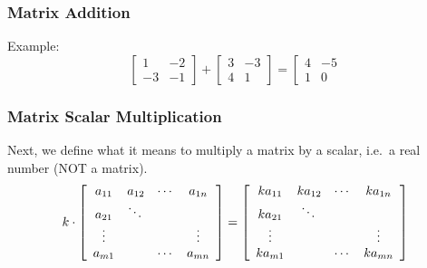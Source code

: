 \documentclass[xcolor=dvipsnames]{beamer}
\begin{document}
\begin{frame}
  \frametitle{Matrix Addition}
  Example:
  \begin{equation}
    \label{eq:pahleuza}
    \left[
      \begin{array}{cc}
        1 & -2 \\
        -3 & -1 
      \end{array}\right]+\left[
      \begin{array}{cc}
        3 & -3 \\
        4 & 1
      \end{array}\right]=\left[
      \begin{array}{cc}
        4 & -5 \\
        1 & 0
      \end{array}
  \end{equation}
\end{frame}

\begin{frame}
  \frametitle{Matrix Scalar Multiplication}
Next, we define what it means to multiply a matrix by a scalar, i.e.\
a real number (NOT a matrix). 
\begin{equation}
  \label{eq:theishie}
  k\cdot\left[\begin{array}{cccc}
    a_{11}&a_{12}&\cdots{}&a_{1n} \\
          a_{21}&\ddots{}&& \\
          \vdots{}&&&\vdots \\
          a_{m1}&&\cdots{}&a_{mn}
  \end{array}\right]=\left[\begin{array}{cccc}
    ka_{11}&ka_{12}&\cdots{}&ka_{1n} \\
          ka_{21}&\ddots{}&& \\
          \vdots{}&&&\vdots \\
          ka_{m1}&&\cdots{}&ka_{mn}
  \end{array}\right]\notag
\end{equation}
\end{frame}
\end{document}
